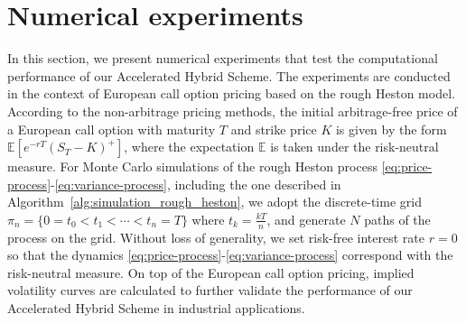 \documentclass[11pt]{article}%
\theoremstyle{definition}
\begin{document}


\section{Numerical experiments}\label{sec:numerical_results}
In this section, we present numerical experiments that test the computational performance of our Accelerated Hybrid Scheme. The experiments are conducted in the context of European call option pricing based on the rough Heston model. According to the non-arbitrage pricing methods, the initial arbitrage-free price of a European call option with maturity \(T\) and strike price \(K\) is given by the form \(\mathbb E [e^{-rT} (S_T - K)^+]\), where the expectation \(\mathbb E\) is taken under the risk-neutral measure. For Monte Carlo simulations of the rough Heston process \eqref{eq:price-process}-\eqref{eq:variance-process}, including the one described in Algorithm~\ref{alg:simulation_rough_heston}, we adopt the discrete-time grid \(\pi_n = \{0=t_0<t_1< \cdots <t_n=T\}\) where \(t_k = \tfrac{kT}{n}\), and generate \(N\) paths of the process on the grid. Without loss of generality, we set risk-free interest rate \(r = 0\) so that the dynamics \eqref{eq:price-process}-\eqref{eq:variance-process} correspond with the risk-neutral measure. On top of the European call option pricing, implied volatility curves are calculated to further validate the performance of our Accelerated Hybrid Scheme in industrial applications.

\end{document}
